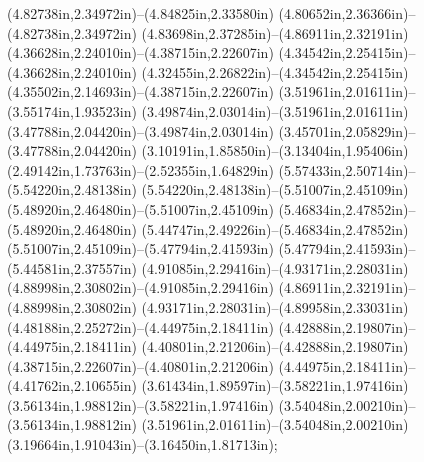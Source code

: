 (4.82738in,2.34972in)--(4.84825in,2.33580in) (4.80652in,2.36366in)--(4.82738in,2.34972in) (4.83698in,2.37285in)--(4.86911in,2.32191in) (4.36628in,2.24010in)--(4.38715in,2.22607in) (4.34542in,2.25415in)--(4.36628in,2.24010in) (4.32455in,2.26822in)--(4.34542in,2.25415in) (4.35502in,2.14693in)--(4.38715in,2.22607in) (3.51961in,2.01611in)--(3.55174in,1.93523in) (3.49874in,2.03014in)--(3.51961in,2.01611in) (3.47788in,2.04420in)--(3.49874in,2.03014in) (3.45701in,2.05829in)--(3.47788in,2.04420in) (3.10191in,1.85850in)--(3.13404in,1.95406in) (2.49142in,1.73763in)--(2.52355in,1.64829in) (5.57433in,2.50714in)--(5.54220in,2.48138in) (5.54220in,2.48138in)--(5.51007in,2.45109in) (5.48920in,2.46480in)--(5.51007in,2.45109in) (5.46834in,2.47852in)--(5.48920in,2.46480in) (5.44747in,2.49226in)--(5.46834in,2.47852in) (5.51007in,2.45109in)--(5.47794in,2.41593in) (5.47794in,2.41593in)--(5.44581in,2.37557in) (4.91085in,2.29416in)--(4.93171in,2.28031in) (4.88998in,2.30802in)--(4.91085in,2.29416in) (4.86911in,2.32191in)--(4.88998in,2.30802in) (4.93171in,2.28031in)--(4.89958in,2.33031in) (4.48188in,2.25272in)--(4.44975in,2.18411in) (4.42888in,2.19807in)--(4.44975in,2.18411in) (4.40801in,2.21206in)--(4.42888in,2.19807in) (4.38715in,2.22607in)--(4.40801in,2.21206in) (4.44975in,2.18411in)--(4.41762in,2.10655in) (3.61434in,1.89597in)--(3.58221in,1.97416in) (3.56134in,1.98812in)--(3.58221in,1.97416in) (3.54048in,2.00210in)--(3.56134in,1.98812in) (3.51961in,2.01611in)--(3.54048in,2.00210in) (3.19664in,1.91043in)--(3.16450in,1.81713in);
